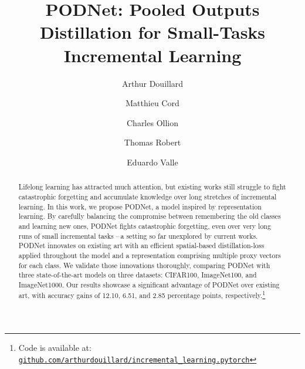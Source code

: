 \documentclass[runningheads]{llncs}
\begin{document}
\pagestyle{headings}
\mainmatter
\def\ECCVSubNumber{3384}  



\title{PODNet: Pooled Outputs Distillation for Small-Tasks Incremental Learning}
\author{Arthur Douillard \and
Matthieu Cord \and
Charles Ollion \and
Thomas Robert \and 
Eduardo Valle
}
\maketitle

\begin{abstract}
Lifelong learning has attracted much attention, but existing works still struggle to fight catastrophic forgetting and accumulate knowledge over long stretches of incremental learning. 
In this work, we propose PODNet, a model inspired by representation learning. By carefully balancing the compromise between remembering the old classes and learning new ones, PODNet fights catastrophic forgetting, even over very long runs of small incremental tasks --\,a setting so far unexplored by current works. PODNet innovates on existing art with an efficient spatial-based distillation-loss applied throughout the model and a representation comprising multiple proxy vectors for each class. We validate those innovations thoroughly, comparing PODNet with three state-of-the-art models on three datasets: CIFAR100, ImageNet100, and ImageNet1000. Our results showcase a significant advantage of PODNet over existing art, with accuracy gains of 12.10, 6.51, and 2.85 percentage points, respectively.\footnote{Code is available at: \href{https://github.com/arthurdouillard/incremental_learning.pytorch}{\texttt{github.com/arthurdouillard/incremental\_learning.pytorch}}}

\end{abstract}
\end{document}
